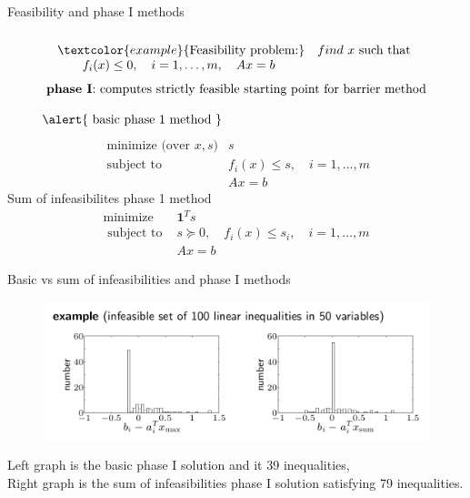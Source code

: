 \documentclass{beamer}
\begin{document}
\begin{frame}[noframenumbering]{Feasibility and phase I methods}
\begin{equation*}
\begin{array}{l} \\ \textcolor{example}{\text {{Feasibility problem:}}} \quad find \ x  \text { such that } \\ {\qquad f_{i}(x) \leq 0, \quad i=1, \ldots, m, \quad A x=b}\end{array}
\end{equation*}
\begin{equation*}
\begin{array}{l} {\text { \textbf{phase I}: computes strictly feasible starting point for barrier method }} \\\\ \alert{\text { {basic phase 1 method} }}\end{array}
\end{equation*}
\begin{equation}
\begin{array}{ll}{ \text { minimize (over }x, s)} & {s} \\ {\text { subject to }} & {f_{i}(x) \leq s, \quad i=1, \ldots, m} \\ {} & {A x=b}\end{array}
\end{equation}
\alert{{Sum of infeasibilites phase 1 method }}
\begin{equation}
\begin{array}{cl}{\operatorname{minimize}} & {\mathbf{1}^{T} s} \\ {\text { subject to }} & {s \succeq 0, \quad f_{i}(x) \leq s_{i}, \quad i=1, \ldots, m} \\ {} & {A x=b}\end{array}
\end{equation}
\end{frame}


\begin{frame}[noframenumbering]{Basic vs sum of infeasibilities and phase I methods}
\begin{figure}
	\centering
	\includegraphics[width=1\linewidth]{Images/sum}
\end{figure}
\alert{Left graph} is the  basic phase I solution and it 39 inequalities,\\ \alert{Right graph}  is the sum of infeasibilities phase I solution satisfying 79 inequalities.
\end{frame}
\end{document}
